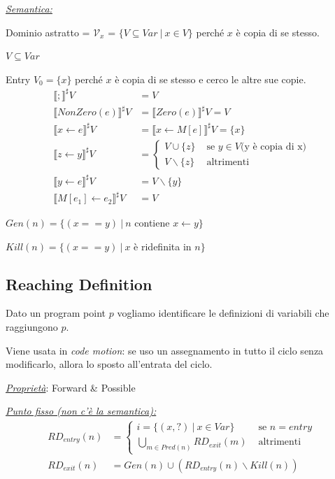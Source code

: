 \documentclass[a4paper, 10pt]{book}
\begin{document}
\noindent
\underline{\textit{Semantica:}}

Dominio astratto = $\mathcal{V}_x$ = $\{V \subseteq Var ~|~ x\in V\}$ perché $x$ è copia di se stesso.

$V\subseteq Var$

Entry $V_0=\{x\}$ perché $x$ è copia di se stesso e cerco le altre sue copie.
\begin{align*}
	\llbracket ; \rrbracket^\sharp V &= V\\
	\llbracket NonZero(e) \rrbracket^\sharp V &= \llbracket Zero(e) \rrbracket^\sharp V = V\\
	\llbracket x\leftarrow e \rrbracket^\sharp V &= \llbracket x\leftarrow M[e]\rrbracket^\sharp V = \{x\}\\
	\llbracket z\leftarrow y \rrbracket^\sharp V &=
	\begin{cases}
		V \cup \{z\} &\text{ se } y\in V \text{(y è copia di x)} \\
		V\backslash \{z\} &\text{ altrimenti}
	\end{cases}\\
	\llbracket y\leftarrow e \rrbracket^\sharp V &= V\backslash \{y\}\\
	\llbracket M[e_1]\leftarrow e_2 \rrbracket^\sharp V &= V
\end{align*}

$Gen(n) = \{(x == y) ~|~ n$ contiene $x\leftarrow y \}$

$Kill(n) = \{(x == y) ~|~ x$ è ridefinita in $n \}$

\subsection{Reaching Definition}
Dato un program point $p$ vogliamo identificare le definizioni di variabili che raggiungono $p$.

\noindent
Viene usata in \textit{code motion}: se uso un assegnamento in tutto il ciclo senza modificarlo, allora lo sposto all'entrata del ciclo.
\newline

\noindent
\textit{\underline{Proprietà}}: Forward \& Possible
\newline

\noindent
\underline{\textit{Punto fisso (non c'è la semantica):}}
\begin{align*}
	RD_{entry}(n) &=
	\begin{cases}
		i=\{(x, ?) ~|~ x\in Var \} &\text{ se $n= entry$} \\
		\bigcup_{m\in Pred(n)} RD_{exit}(m) &\text{ altrimenti}
	\end{cases}\\
	RD_{exit}(n) &= Gen(n) \cup (RD_{entry}(n)\backslash Kill(n))
\end{align*}
\end{document}
